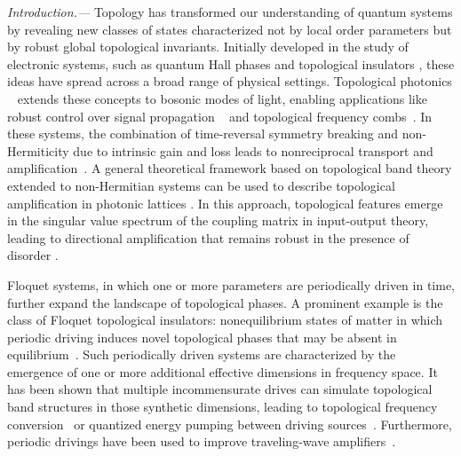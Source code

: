 \documentclass[prl,twocolumn,floatfix,10pt,superscriptaddress]{revtex4-2}
\begin{document}
\maketitle

{\it Introduction.---} 
Topology has transformed our understanding of quantum systems by revealing new classes of states characterized not by local order parameters but by robust global topological invariants. Initially developed in the study of electronic systems, such as quantum Hall phases and topological insulators \cite{Hasan2010,Qi2011}, these ideas have spread across a broad range of physical settings. Topological photonics ~\cite{Lu2014,Ozawa2019,Mehrabad23} extends these concepts to bosonic modes of light, enabling applications like robust control over signal propagation ~\cite{Barik2018} and topological frequency combs~\cite{Flower2024}. In these systems, the combination of time-reversal symmetry breaking and non-Hermiticity due to intrinsic gain and loss leads to nonreciprocal transport and amplification~\cite{Metelmann15,Fang2017,peano2016,McDonald2022, delPino2022,Busnaina2024, Slim2024,Ramos2022}. A general theoretical framework based on topological band theory extended to non-Hermitian systems \cite{Esaki2011,Gong2018} can be used to describe topological amplification in photonic lattices \cite{Porras2019,wanjura2020topological}.
In this approach, topological features emerge in the singular value spectrum of the coupling matrix in input-output theory, leading to directional amplification that remains robust in the presence of disorder 
\cite{Ramos2021, Wanjura2021,Gomez2022, GomezLeon2023, ClaveroRubio2025}. 

Floquet systems, in which one or more parameters are periodically driven in time, further expand the landscape of topological phases. A prominent example is the class of Floquet topological insulators: nonequilibrium states of matter in which periodic driving induces novel topological phases that may be absent in equilibrium~\cite{Lindner2011,Rechtsman2013,GomezLeon2013,Baum2018}. Such periodically driven systems are characterized by the emergence of one or more additional effective dimensions in frequency space. It has been shown that multiple incommensurate drives can simulate topological band structures in those synthetic dimensions, leading to topological frequency conversion~\cite{Martin2017} or quantized energy pumping between driving sources~\cite{Luneau2022}. {\color{blue}Furthermore, periodic drivings have been used to improve traveling-wave amplifiers~\cite{Peng2022}.}
\end{document}
